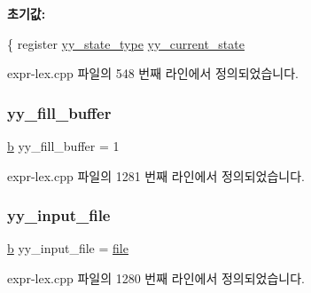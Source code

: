 {\bfseries 초기값\+:}
\begin{DoxyCode}
\{
        \textcolor{keyword}{register} \mbox{\hyperlink{expr-lex_8cpp_a9ba7c416f135b0f0c1f4addded4616b5}{yy\_state\_type}} \mbox{\hyperlink{expr-lex_8cpp_abb8b9672f94e21056888ae611b41cd1b}{yy\_current\_state}}
\end{DoxyCode}


expr-\/lex.\+cpp 파일의 548 번째 라인에서 정의되었습니다.

\mbox{\label{expr-lex_8cpp_a0a1dd9ce87a49536adf8f6362b071057}} 
\subsubsection{\texorpdfstring{yy\+\_\+fill\+\_\+buffer}{yy\_fill\_buffer}}
{\footnotesize\ttfamily \mbox{\hyperlink{expr-lex_8cpp_a91b64995742fd30063314f12340b4b5a}{b}} yy\+\_\+fill\+\_\+buffer = 1}



expr-\/lex.\+cpp 파일의 1281 번째 라인에서 정의되었습니다.

\mbox{\label{expr-lex_8cpp_af6c25e1253452c8f667697b573db784f}} 
\subsubsection{\texorpdfstring{yy\+\_\+input\+\_\+file}{yy\_input\_file}}
{\footnotesize\ttfamily \mbox{\hyperlink{expr-lex_8cpp_a91b64995742fd30063314f12340b4b5a}{b}} yy\+\_\+input\+\_\+file = \mbox{\hyperlink{expr-lex_8cpp_a702945180aa732857b380a007a7e2a21}{file}}}



expr-\/lex.\+cpp 파일의 1280 번째 라인에서 정의되었습니다.

\mbox{\label{expr-lex_8cpp_ad05318f0f8d19c7e46d72303ae11820e}} 
